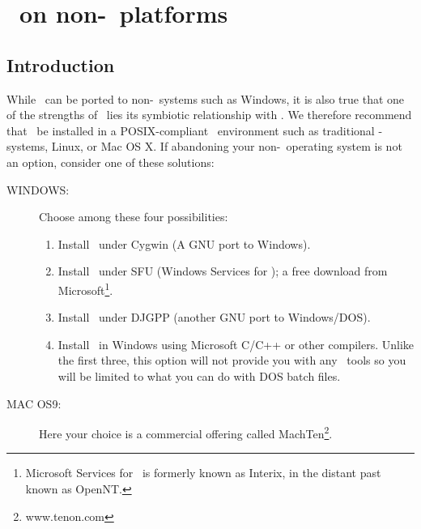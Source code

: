 %
%
\chapter{\gmt\ on non-\UNIX\ platforms}
\label{app:L}
\thispagestyle{headings}

\section{Introduction}

While \GMT\ can be ported to non-\UNIX\ systems such as
Windows, it is also true that one of the
strengths of \GMT\ lies its symbiotic relationship with
\UNIX.  We therefore recommend that \GMT\ be installed in
a POSIX-compliant \UNIX\ environment such as traditional \UNIX-systems, Linux,
or Mac OS X.  If abandoning your non-\UNIX\ operating system
is not an option, consider one of these solutions:

\begin{description}
\item [WINDOWS:] Choose among these four possibilities:

\begin{enumerate}

\item Install \GMT\ under Cygwin (A GNU port to Windows). 

\item Install \GMT\ under SFU (Windows Services for \UNIX); a free download from
Microsoft\footnote{Microsoft Services for \UNIX\ is formerly known as Interix, in the distant past known as OpenNT.}.

\item Install \GMT\ under DJGPP (another GNU port to Windows/DOS).

\item Install \GMT\ in Windows using Microsoft C/C++ or other
compilers.  Unlike the first three, this option will not provide you with any
\UNIX\ tools so you will be limited to what you can do with
DOS batch files.


\end{enumerate}

\item [MAC OS9:] Here your choice is a commercial offering called MachTen\footnote{www.tenon.com}.
\end{description}


